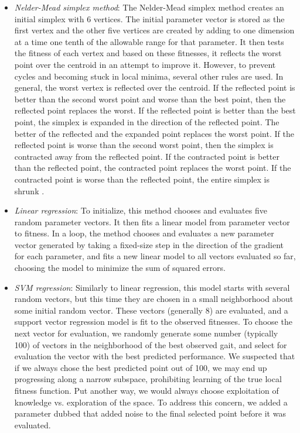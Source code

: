 \begin{itemize}
\item \emph{Nelder-Mead simplex method}\cite{nm}: The Nelder-Mead
  simplex method creates an initial simplex with 6 vertices. The
  initial parameter vector is stored as the first vertex and the other
  five vertices are created by adding to one dimension at a time one
  tenth of the allowable range for that parameter. It then tests the
  fitness of each vertex and based on these fitnesses, it reflects the
  worst point over the centroid in an attempt to improve it.  However,
  to prevent cycles and becoming stuck in local minima, several other
  rules are used.  In general, the worst vertex is reflected over the
  centroid. If the reflected point is better than the second worst
  point and worse than the best point, then the reflected point
  replaces the worst. If the reflected point is better than the best
  point, the simplex is expanded in the direction of the reflected
  point. The better of the reflected and the expanded point replaces
  the worst point. If the reflected point is worse than the second
  worst point, then the simplex is contracted away from the reflected
  point. If the contracted point is better than the reflected point,
  the contracted point replaces the worst point. If the contracted
  point is worse than the reflected point, the entire simplex is
  shrunk \cite{nm}.

\item \emph{Linear regression}: To initialize, this method chooses and
  evaluates five random parameter vectors. It then fits a linear model
  from parameter vector to fitness. In a loop, the method chooses and
  evaluates a new parameter vector generated by taking a fixed-size
  step in the direction of the gradient for each parameter, and fits a
  new linear model to all vectors evaluated so far, choosing the model
  to minimize the sum of squared errors.

\item \emph{SVM regression}: Similarly to linear regression, this
  model starts with several random vectors, but this time they are
  chosen in a small neighborhood about some initial random vector.
  These vectors (generally 8) are evaluated, and a support vector
  regression model is fit to the observed fitnesses.  To choose the
  next vector for evaluation, we randomly generate some number
  (typically 100) of vectors in the neighborhood of the best observed
  gait, and select for evaluation the vector with the best predicted
  performance.  We suspected that if we always chose the best
  predicted point out of 100, we may end up progressing along a narrow
  subspace, prohibiting learning of the true local fitness function.
  Put another way, we would always choose exploitation of knowledge
  vs. exploration of the space.  To address this concern, we added a
  parameter dubbed  that added noise to the final
  selected point before it was evaluated.


\end{itemize}
